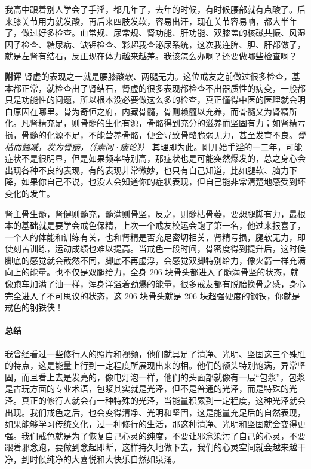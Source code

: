 \begin{case}[坚固之相]
    我高中跟着别人学会了手淫，都几年了，去年的时候，有时候腰部就有点酸了。后来膝关节用力就发酸，再后来四肢发软，容易出汗，现在关节容易响，都大半年了，做过好多检查。血常规、尿常规、肾功能、肝功能、双膝盖的核磁共振、风湿因子检查、糖尿病、缺钾检查、彩超我查泌尿系统，这次我连脾、胆、肝都做了，就是左肾有结石，反正现在体力越来越差。我该怎么办啊？还要做哪些检查啊？

    \textbf{附评} 肾虚的表现之一就是腰膝酸软、两腿无力。这位戒友之前做过很多检查，基本都正常，就检查出了肾结石，肾虚的很多表现都检查不出器质性的病变，一般都只是功能性的问题，所以根本没必要做这么多的检查，真正懂得中医的医理就会明白原因在哪里。骨为奇恒之府，内藏骨髓，骨则赖髓以充养，而骨髓又为肾精所化。凡肾精充足，则骨髓的生化有源，骨骼得到充分的滋养而坚固有力；如肾精亏损，骨髓的化源不足，不能营养骨骼，便会导致骨骼脆弱无力，甚至发育不良。\textit{骨枯而髓减，发为骨痿，（《素问·痿论》）} 其理即为此。刚开始手淫的一二年，可能症状不是很明显，但是如果频率特别高，那症状也是可能突然爆发的，总之身心会出现各种不良的表现，有的表现非常微妙，也只有自己知道，比如腿软、脑力下降，如果你自己不说，也没人会知道你的症状表现，但自己能非常清楚地感受到坏变化的发生。

    肾主骨生髓，肾健则髓充，髓满则骨坚，反之，则髓枯骨萎，要想腿脚有力，最根本的基础就是要学会戒色保精，上次一个戒友校运会跑了第一名，他过来报喜了，一个人的体能和训练有关，也和肾精是否充足密切相关，肾精亏损，腿软无力，即使刻苦训练，运动成绩也难以提高。当戒色一段时间，骨密度得到提升后，这时候脚底的感觉就会截然不同，脚底不再虚浮，会感觉双脚特别给力，像火箭一样充满向上的能量。也不仅是双腿给力，全身 206 块骨头都进入了髓满骨坚的状态，就像跑车加满了油一样，浑身洋溢着劲爆的能量，很多戒友都有脱胎换骨之感，身心完全进入了不可思议的状态，这 206 块骨头就是 206 块超强硬度的钢铁，你就是戒色的钢铁侠！
\end{case}

\paragraph*{总结}

我曾经看过一些修行人的照片和视频，他们就具足了清净、光明、坚固这三个殊胜的特点，这是能量上行到一定程度所展现出来的相。他们的额头特别饱满，异常坚固，而且看上去是发亮的，像电灯泡一样，他们的头面部就像有一层“包浆”，包浆是古玩方面的专业术语，包浆其实就是光泽，但不是普通的光泽，而是特殊的光泽。真正的修行人就会有一种特殊的光泽，当能量积累到一定程度，这种光泽就会出现。我们戒色之后，也会变得清净、光明和坚固，这是能量充足后的自然表现，如果能够学习传统文化，过一种修行的生活，那这种清净、光明和坚固就会变得更强。我们戒色就是为了恢复自己心灵的纯度，不要让邪念染污了自己的心灵，不要跟着邪念跑，要做到念起即断，这样持久地做下去，我们的心灵空间就会越来越干净，到时候纯净的大喜悦和大快乐自然如泉涌。

